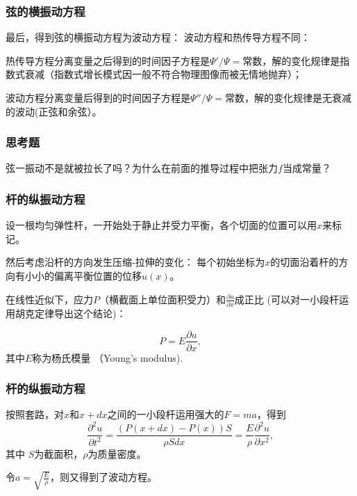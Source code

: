 \documentclass[CJK]{beamer}
\begin{document}
\begin{frame}
\frametitle{弦的横振动方程}

最后，得到弦的横振动方程为波动方程：
波动方程和热传导方程不同：
\bitem
\item{热传导方程分离变量之后得到的时间因子方程是$\Psi'/\Psi =$常数，解的变化规律是指数式衰减（指数式增长模式因一般不符合物理图像而被无情地抛弃）；}
\item{
  波动方程分离变量后得到的时间因子方程是$\Psi''/\Psi =$常数，解的变化规律是无衰减的波动(正弦和余弦）。}
  \eitem


\end{frame}


\begin{frame}
\frametitle{思考题}


弦一振动不是就被拉长了吗？为什么在前面的推导过程中把张力$f$当成常量？

\end{frame}


\begin{frame}
\frametitle{杆的纵振动方程}

设一根均匀弹性杆，一开始处于静止并受力平衡，各个切面的位置可以用$x$来标记。

然后考虑沿杆的方向发生压缩-拉伸的变化： 每个初始坐标为$x$的切面沿着杆的方向有小小的偏离平衡位置的位移$u(x)$。


在线性近似下，应力$P$（横截面上单位面积受力）和$\frac{\partial u}{\partial x}$成正比 (可以对一小段杆运用胡克定律导出这个结论)：

$$ P = E\frac{\partial u}{\partial x},$$
其中$E$称为杨氏模量 （Young's modulus).


\end{frame}



\begin{frame}
\frametitle{杆的纵振动方程}


按照套路，对$x$和$x+dx$之间的一小段杆运用强大的$F=ma$，得到
$$ \frac{\partial^2u}{\partial t^2} = \frac{(P(x+dx)-P(x))S}{\rho S dx} = \frac{E}{\rho} \frac{\partial^2u}{\partial x^2},$$
其中 $S$为截面积，$\rho$为质量密度。

\skipline

令$a = \sqrt{\frac{E}{\rho}}$，则又得到了波动方程。



\end{frame}
\end{document}
